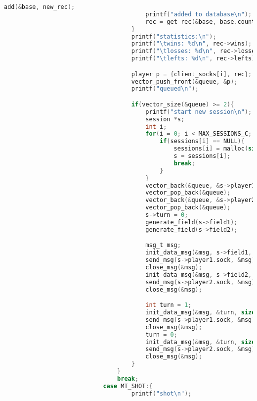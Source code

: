 \documentclass[12pt]{article}
\begin{document}
\begin{lstlisting}[language=C, basicstyle=\scriptsize]
                                        add(&base, new_rec);
                                        printf("added to database\n");
                                        rec = get_rec(&base, base.count - 1);
                                    }
                                    printf("statistics:\n");
                                    printf("\twins: %d\n", rec->wins);
                                    printf("\tlosses: %d\n", rec->losses);
                                    printf("\tlefts: %d\n", rec->lefts);

                                    player p = {client_socks[i], rec};
                                    vector_push_front(&queue, &p);
                                    printf("queued\n");

                                    if(vector_size(&queue) >= 2){
                                        printf("start new session\n");
                                        session *s;
                                        int i;
                                        for(i = 0; i < MAX_SESSIONS_C; i++){
                                            if(sessions[i] == NULL){
                                                sessions[i] = malloc(sizeof(session));
                                                s = sessions[i];
                                                break;
                                            }
                                        }
                                        vector_back(&queue, &s->player1);
                                        vector_pop_back(&queue);
                                        vector_back(&queue, &s->player2);
                                        vector_pop_back(&queue);
                                        s->turn = 0;
                                        generate_field(s->field1);
                                        generate_field(s->field2);

                                        msg_t msg;
                                        init_data_msg(&msg, s->field1, 100, MT_FIELD, i);
                                        send_msg(s->player1.sock, &msg);
                                        close_msg(&msg);
                                        init_data_msg(&msg, s->field2, 100, MT_FIELD, i);
                                        send_msg(s->player2.sock, &msg);
                                        close_msg(&msg);

                                        int turn = 1;
                                        init_data_msg(&msg, &turn, sizeof(int), MT_TURN, 0);
                                        send_msg(s->player1.sock, &msg);
                                        close_msg(&msg);
                                        turn = 0;
                                        init_data_msg(&msg, &turn, sizeof(int), MT_TURN, 0);
                                        send_msg(s->player2.sock, &msg);
                                        close_msg(&msg);
                                    }
                                }
                                break;
                            case MT_SHOT:{
                                    printf("shot\n");


\end{lstlisting}
\end{document}
